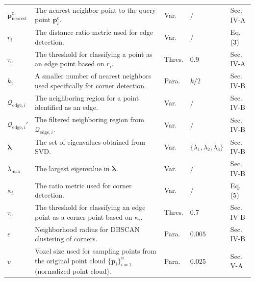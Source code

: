 \documentclass[onecolumn]{IEEEtran}
\begin{document}
\begin{longtable}{p{1cm} p{10cm} p{1cm} p{1.8cm} p{2 cm}}
$\mathbf{p}_{\text{nearest}}^\text{c}$ & The nearest neighbor point to the query point $\mathbf{p}_i^\text{c}$. & Var. & / & Sec. IV-A \\

$r_i$ & The distance ratio metric used for edge detection. & Var. & / & Eq. (3) \\

$\tau_\text{e}$ & The threshold for classifying a point as an edge point based on $r_i$. & Thres. & $0.9$ & Sec. IV-A \\

$k_1$ & A smaller number of nearest neighbors used specifically for corner detection. & Para. & $k/2$ & Sec. IV-B \\

$\mathcal{Q}_{\text{edge}, i}$ & The neighboring region for a point identified as an edge. & Var. & / & Sec. IV-B \\

$\mathcal{Q}_{\text{edge}, i}'$ & The filtered neighboring region from $\mathcal{Q}_{\text{edge}, i}$. & Var. & / & Sec. IV-B \\


$\boldsymbol{\lambda}$ & The set of eigenvalues obtained from SVD. & Var. & $\{\lambda_1, \lambda_2, \lambda_3\}$ & Sec. IV-B \\

$\lambda_{\text{max}}$ & The largest eigenvalue in $\boldsymbol{\lambda}$. & Var. & / & Sec. IV-B \\

$\kappa_i$ & The ratio metric used for corner detection. & Var. & / & Eq. (5) \\

$\tau_\text{c}$ & The threshold for classifying an edge point as a corner point based on $\kappa_i$. & Thres. & $0.7$ & Sec. IV-B \\

$\epsilon$ & Neighborhood radius for DBSCAN clustering of corners. & Para. & $0.005$ & Sec. IV-B \\

$v$ & Voxel size used for sampling points from the original point cloud $\{\mathbf{p}_i\}_{i=1}^n$ (normalized point cloud). & Para. & 0.025 & Sec. V-A \\


\end{longtable}
\end{document}
